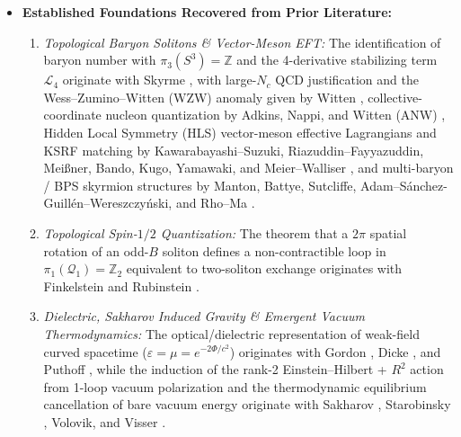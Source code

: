 \documentclass[10pt,aps,prd,twocolumn,superscriptaddress,nofootinbib,floatfix,longbibliography,showkeys]{revtex4-2}
\begin{document}
\begin{itemize}
  \item \textbf{Established Foundations Recovered from Prior Literature:}
  \begin{enumerate}
    \item \textit{Topological Baryon Solitons \& Vector-Meson EFT:} The identification of baryon number with $\pi_3(S^3) = \mathbb{Z}$ and the 4-derivative stabilizing term $\mathcal{L}_4$ originate with Skyrme \cite{ref1,ref2}, with large-$N_c$ QCD justification and the Wess--Zumino--Witten (WZW) anomaly given by Witten \cite{ref3,ref4,ref5}, collective-coordinate nucleon quantization by Adkins, Nappi, and Witten (ANW) \cite{ref43}, Hidden Local Symmetry (HLS) vector-meson effective Lagrangians and KSRF matching by Kawarabayashi--Suzuki, Riazuddin--Fayyazuddin, Mei\ss{}ner, Bando, Kugo, Yamawaki, and Meier--Walliser \cite{ref6,ref7,ref8,ref9,ref10}, and multi-baryon / BPS skyrmion structures by Manton, Battye, Sutcliffe, Adam--S\'anchez-Guill\'en--Wereszczy\'nski, and Rho--Ma \cite{ref44,ref45,ref46,ref47,ref48,ref49}.
    \item \textit{Topological Spin-$1/2$ Quantization:} The theorem that a $2\pi$ spatial rotation of an odd-$B$ soliton defines a non-contractible loop in $\pi_1(\mathcal{Q}_1) = \mathbb{Z}_2$ equivalent to two-soliton exchange originates with Finkelstein and Rubinstein \cite{ref11}.
    \item \textit{Dielectric, Sakharov Induced Gravity \& Emergent Vacuum Thermodynamics:} The optical/dielectric representation of weak-field curved spacetime ($\varepsilon = \mu = e^{-2\Phi/c^2}$) originates with Gordon \cite{ref12}, Dicke \cite{ref17}, and Puthoff \cite{ref14}, while the induction of the rank-2 Einstein--Hilbert + $R^2$ action from 1-loop vacuum polarization and the thermodynamic equilibrium cancellation of bare vacuum energy originate with Sakharov \cite{ref13}, Starobinsky \cite{ref27}, Volovik, and Visser \cite{ref15,ref16,ref25,ref26,ref30,ref31,ref32}.


\end{enumerate}
\end{itemize}
\end{document}
